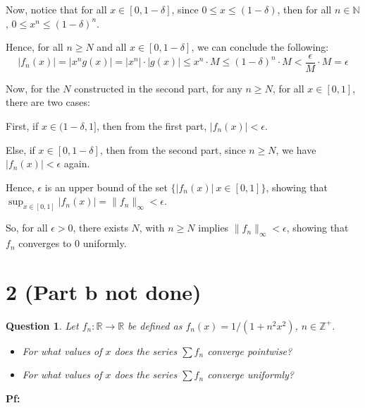 \documentclass{article}
\newtheorem{question}{Question}
\begin{document}
Now, notice that for all $x\in[0,1-\delta]$, since $0\leq x \leq (1-\delta)$, then for all $n\in\mathbb{N}$, $0\leq x^n\leq (1-\delta)^n$.

Hence, for all $n\geq N$ and all $x\in [0,1-\delta]$, we can conclude the following:
$$|f_n(x)| = |x^ng(x)| = |x^n|\cdot |g(x)| \leq x^n\cdot M \leq (1-\delta)^n\cdot M< \frac{\epsilon}{M}\cdot M=\epsilon$$

\hfill

Now, for the $N$ constructed in the second part, for any $n\geq N$, for all $x\in[0,1]$, there are two cases:

First, if $x\in (1-\delta,1]$, then from the first part, $|f_n(x)|<\epsilon$.

Else, if $x\in [0,1-\delta]$, then from the second part, since $n\geq N$, we have $|f_n(x)|<\epsilon$ again.

Hence, $\epsilon$ is an upper bound of the set $\{|f_n(x)|\ x\in [0,1]\}$, showing that $\sup_{x\in[0,1]}|f_n(x)|=\|f_n\|_\infty < \epsilon$.

So, for all $\epsilon>0$, there exists $N$, with $n\geq N$ implies $\|f_n\|_\infty<\epsilon$, showing that $f_n$ converges to $0$ uniformly.

\break

\section*{2 (Part b not done)}
\begin{myBox}[]{}
    \begin{question}
        Let $f_n:\mathbb{R}\rightarrow\mathbb{R}$ be defined as $f_n(x)=1/(1+n^2x^2)$, $n\in\mathbb{Z}^+$.
        \begin{itemize}
            \item[(a)] For what values of $x$ does the series $\sum f_n$ converge pointwise?
            \item[(b)] For what values of $x$ does the series $\sum f_n$ converge uniformly? 
        \end{itemize}
    \end{question}
\end{myBox}

\textbf{Pf:}
\end{document}
